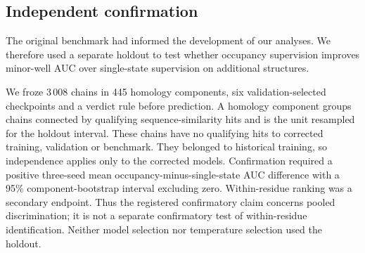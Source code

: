 \documentclass[10pt,twocolumn,a4paper]{article}
\begin{document}
\subsection{Independent confirmation}
The original benchmark had informed the development of our analyses. We therefore used a separate holdout to test whether occupancy supervision improves minor-well AUC over single-state supervision on additional structures.

We froze 3\,008 chains in 445 homology components, six validation-selected checkpoints and a verdict rule before prediction. A homology component groups chains connected by qualifying sequence-similarity hits and is the unit resampled for the holdout interval. These chains have no qualifying hits to corrected training, validation or benchmark. They belonged to historical training, so independence applies only to the corrected models. Confirmation required a positive three-seed mean occupancy-minus-single-state AUC difference with a 95\% component-bootstrap interval excluding zero. Within-residue ranking was a secondary endpoint. Thus the registered confirmatory claim concerns pooled discrimination; it is not a separate confirmatory test of within-residue identification. Neither model selection nor temperature selection used the holdout.
\end{document}
